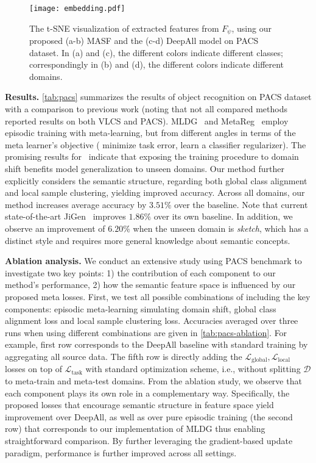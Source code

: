 \documentclass{article}
\newcommand{\Domains}{\mathcal{D}}
\newcommand{\TaskLoss}{\mathcal{L}_\mathrm{task}}
\newcommand{\LabelLoss}{\mathcal{L}_\mathrm{global}}
\newcommand{\MetricLoss}{\mathcal{L}_\mathrm{local}}
\begin{document}
\begin{figure}[t]
    \centering
    \texttt{[image: embedding.pdf]}
\caption{The t-SNE visualization of extracted features from $F_\psi$, using our proposed (a-b) MASF and the (c-d) DeepAll model on PACS dataset. In (a) and (c), the different colors indicate different classes; correspondingly in (b) and (d), the different colors indicate different domains.}
    \label{fig:tsne}
\end{figure}

\textbf{Results.} \cref{tab:pacs} summarizes the results of object recognition on PACS dataset with a comparison to previous work (noting that not all compared methods reported results on both VLCS and PACS). MLDG~\citep{li2018learning} and MetaReg~\citep{balaji2018metareg} employ episodic training with meta-learning, but from different angles in terms of the meta learner's objective (\citet{li2018learning} minimize task error, \citet{balaji2018metareg} learn a classifier regularizer).
The promising results for~\citep{balaji2018metareg,li2018learning,li2019episodic} indicate that exposing the training procedure to domain shift benefits model generalization to unseen domains. Our method further explicitly considers the semantic structure, regarding both global class alignment and local sample clustering, yielding improved accuracy. Across all domains, our method increases average accuracy by $3.51\%$ over the baseline.
Note that current state-of-the-art JiGen~\citep{carlucci2019domain} improves $1.86\%$ over its own baseline.
In addition, we observe an improvement of $6.20\%$ when the unseen domain is \textit{sketch}, which has a distinct style and requires more general knowledge about semantic concepts.

\textbf{Ablation analysis.} We conduct an extensive study using PACS benchmark to investigate two key points: 1) the contribution of each component to our method's performance, 2) how the semantic feature space is influenced by our proposed meta losses.
First, we test all possible combinations of including the key components: episodic meta-learning simulating domain shift, global class alignment loss and local sample clustering loss. 
Accuracies averaged over three runs when using different combinations are given in \cref{tab:pacs-ablation}. For example, first row corresponds to the DeepAll baseline with standard training by aggregating all source data. The fifth row is directly adding the $\LabelLoss, \MetricLoss$ losses on top of $\TaskLoss$ with standard optimization scheme, i.e., without splitting $\Domains$ to meta-train and meta-test domains. From the ablation study, we observe that each component plays its own role in a complementary way. Specifically, the proposed losses that encourage semantic structure in feature space yield improvement over DeepAll, as well as over pure episodic training (the second row) that corresponds to our implementation of MLDG thus enabling straightforward comparison. By further leveraging the gradient-based update paradigm, performance is further improved across all settings.
\end{document}
